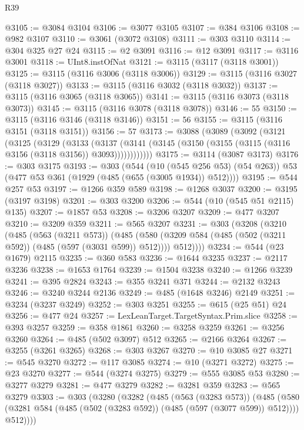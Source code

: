 \begin{lexlean}{R39}
\begin{coremodule}
@3105 := @3084 @3104
@3106 := @3077 @3105
@3107 := @384 @3106
@3108 := @982 @3107
@3110 := @3061 (@3072 @3108)
@3111 := @303 @3110
@3114 := @304 @325 @27 @24
@3115 := @2 @3091
@3116 := @12 @3091
@3117 := @3116 @3001
@3118 := UInt8.instOfNat
@3121 := @3115 (@3117 (@3118 @3001))
@3125 := @3115 (@3116 @3006 (@3118 @3006))
@3129 := @3115 (@3116 @3027 (@3118 @3027))
@3133 := @3115 (@3116 @3032 (@3118 @3032))
@3137 := @3115 (@3116 @3065 (@3118 @3065))
@3141 := @3115 (@3116 @3073 (@3118 @3073))
@3145 := @3115 (@3116 @3078 (@3118 @3078))
@3146 := 55
@3150 := @3115 (@3116 @3146 (@3118 @3146))
@3151 := 56
@3155 := @3115 (@3116 @3151 (@3118 @3151))
@3156 := 57
@3173 := @3088
    (@3089
      (@3092
        (@3121
          (@3125
            (@3129
              (@3133
                (@3137
                  (@3141 (@3145 (@3150 (@3155 (@3115 (@3116 @3156 (@3118 @3156)) @3093))))))))))))
@3175 := @3114 (@3087 @3173)
@3176 := @303 @3175
@3193 := @303
    (@544
      (@10 (@545 @256 @53) (@54 @263))
      @53
      (@477 @53 @361 (@1929 (@485 (@655 (@3005 @1934)) @512))))
@3195 := @544 @257 @53
@3197 := @1266 @359 @589
@3198 := @1268 @3037
@3200 := @3195 (@3197 @3198)
@3201 := @303 @3200
@3206 := @544 (@10 (@545 @51 @2115) @135)
@3207 := @1857 @53
@3208 := @3206 @3207
@3209 := @477 @3207
@3210 := @3209 @359
@3211 := @565 @3207
@3231 := @303
    (@3208
      (@3210
        (@485
          (@563 (@3211 @573))
          (@485
            (@580 (@3209 @584 (@485 (@502 (@3211 @592)) (@485 (@597 (@3031 @599)) @512))))
            @512))))
@3234 := @544 (@23 @1679) @2115
@3235 := @360 @583
@3236 := @1644 @3235
@3237 := @2117 @3236
@3238 := @1653 @1764
@3239 := @1504 @3238
@3240 := @1266 @3239
@3241 := @395 @2824
@3243 := @355 @3241 @371
@3244 := @2132 @3243
@3246 := @3240 @3244 @2136
@3249 := @485 (@1648 @3246) @2149
@3251 := @3234 (@3237 @3249)
@3252 := @303 @3251
@3255 := @615 (@25 @51) @24
@3256 := @477 @24
@3257 := LexLeanTarget.TargetSyntax.Prim.slice
@3258 := @393 @3257
@3259 := @358 @1861
@3260 := @3258 @3259
@3261 := @3256 @3260
@3264 := @485 (@502 @3097) @512
@3265 := @2166 @3264
@3267 := @3255 (@3261 @3265)
@3268 := @303 @3267
@3270 := @10 @3085 @27
@3271 := @545 @3270
@3272 := @117 @3085
@3274 := @10 (@3271 @3272)
@3275 := @23 @3270
@3277 := @544 (@3274 @3275)
@3279 := @555 @3085 @53
@3280 := @3277 @3279
@3281 := @477 @3279
@3282 := @3281 @359
@3283 := @565 @3279
@3303 := @303
    (@3280
      (@3282
        (@485
          (@563 (@3283 @573))
          (@485
            (@580 (@3281 @584 (@485 (@502 (@3283 @592)) (@485 (@597 (@3077 @599)) @512))))
            @512))))

\end{coremodule}
\end{lexlean}
